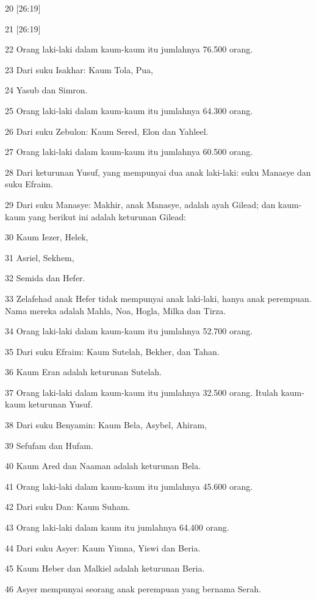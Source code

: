 \par 20 [26:19]
\par 21 [26:19]
\par 22 Orang laki-laki dalam kaum-kaum itu jumlahnya 76.500 orang.
\par 23 Dari suku Isakhar: Kaum Tola, Pua,
\par 24 Yasub dan Simron.
\par 25 Orang laki-laki dalam kaum-kaum itu jumlahnya 64.300 orang.
\par 26 Dari suku Zebulon: Kaum Sered, Elon dan Yahleel.
\par 27 Orang laki-laki dalam kaum-kaum itu jumlahnya 60.500 orang.
\par 28 Dari keturunan Yusuf, yang mempunyai dua anak laki-laki: suku Manasye dan suku Efraim.
\par 29 Dari suku Manasye: Makhir, anak Manasye, adalah ayah Gilead; dan kaum-kaum yang berikut ini adalah keturunan Gilead:
\par 30 Kaum Iezer, Helek,
\par 31 Asriel, Sekhem,
\par 32 Semida dan Hefer.
\par 33 Zelafehad anak Hefer tidak mempunyai anak laki-laki, hanya anak perempuan. Nama mereka adalah Mahla, Noa, Hogla, Milka dan Tirza.
\par 34 Orang laki-laki dalam kaum-kaum itu jumlahnya 52.700 orang.
\par 35 Dari suku Efraim: Kaum Sutelah, Bekher, dan Tahan.
\par 36 Kaum Eran adalah keturunan Sutelah.
\par 37 Orang laki-laki dalam kaum-kaum itu jumlahnya 32.500 orang. Itulah kaum-kaum keturunan Yusuf.
\par 38 Dari suku Benyamin: Kaum Bela, Asybel, Ahiram,
\par 39 Sefufam dan Hufam.
\par 40 Kaum Ared dan Naaman adalah keturunan Bela.
\par 41 Orang laki-laki dalam kaum-kaum itu jumlahnya 45.600 orang.
\par 42 Dari suku Dan: Kaum Suham.
\par 43 Orang laki-laki dalam kaum itu jumlahnya 64.400 orang.
\par 44 Dari suku Asyer: Kaum Yimna, Yiswi dan Beria.
\par 45 Kaum Heber dan Malkiel adalah keturunan Beria.
\par 46 Asyer mempunyai seorang anak perempuan yang bernama Serah.
